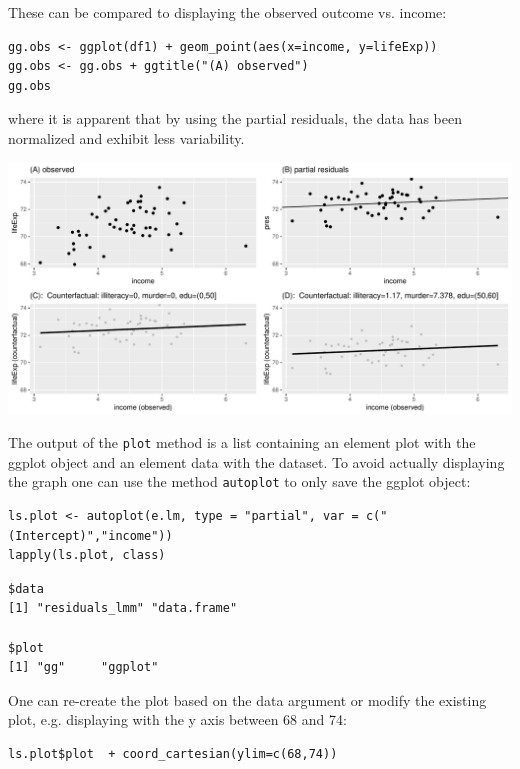 \documentclass[12pt]{article}
\begin{document}
\clearpage

These can be compared to displaying the observed outcome vs. income:
\lstset{language=r,label= ,caption= ,captionpos=b,numbers=none}
\begin{lstlisting}
gg.obs <- ggplot(df1) + geom_point(aes(x=income, y=lifeExp))
gg.obs <- gg.obs + ggtitle("(A) observed")
gg.obs
\end{lstlisting}

where it is apparent that by using the partial residuals, the data has
been normalized and exhibit less variability.
\begin{center}
\includegraphics[trim={0 0 0 0},width=1\textwidth]{./figures/gg-lmpres-comparisons.pdf}
\end{center}

The output of the \texttt{plot} method is a list containing an element plot
with the ggplot object and an element data with the dataset. To avoid
actually displaying the graph one can use the method \texttt{autoplot} to
only save the ggplot object:
\lstset{language=r,label= ,caption= ,captionpos=b,numbers=none}
\begin{lstlisting}
ls.plot <- autoplot(e.lm, type = "partial", var = c("(Intercept)","income"))
lapply(ls.plot, class)
\end{lstlisting}

\begin{verbatim}
$data
[1] "residuals_lmm" "data.frame"   

$plot
[1] "gg"     "ggplot"
\end{verbatim}


One can re-create the plot based on the data argument or modify the
existing plot, e.g. displaying with the y axis between 68 and 74:
\lstset{language=r,label= ,caption= ,captionpos=b,numbers=none}
\begin{lstlisting}
ls.plot$plot  + coord_cartesian(ylim=c(68,74))
\end{lstlisting}
\end{document}
